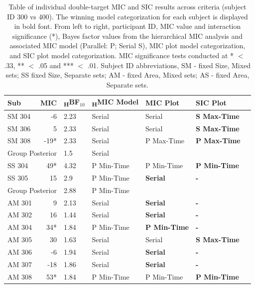 \clearpage
\begin{table}[!htb]
\caption{Table of individual double-target MIC and SIC results across criteria (subject ID 300 vs 400). The winning model categorization for each subject is displayed in bold font. From left to right, participant ID, MIC value and interaction significance (*), Bayes factor values from the hierarchical MIC analysis and associated MIC model (Parallel: P; Serial S), MIC plot model categorization, and SIC plot model categorization. MIC significance tests conducted at * $<$ .33, ** $<$ .05 and *** $<$ .01. Subject ID abbreviations, SM - fixed Size, Mixed sets; SS fixed Size, Separate sets; AM - fixed Area, Mixed sets; AS - fixed Area, Separate sets.}
\centering 
\begin{tabular*}{\textwidth}{l @{\extracolsep{\fill}} rlllll}
\hline
\textbf{Sub  } & \textbf{MIC} & \textbf{\textsubscript{H}BF$_{10}$} & \textbf{\textsubscript{H}MIC Model}  & \textbf{MIC Plot} & \textbf{SIC Plot}\\  
\hline
SM 304  & -6  & 2.23 & Serial & Serial & \textbf{S Max-Time} \\ %
SM 306  & 5  & 2.33 & Serial  & Serial & \textbf{S Max-Time} \\ %
SM 308  & -19*  & 2.33 & Serial  & P Max-Time & \textbf{P Max-Time} \\ %
\multicolumn{2}{r}{Group Posterior} & 1.5 & Serial & ~ & ~\\
\hline
SS 304  & 49*  & 4.32 & P Min-Time  & P Min-Time & \textbf{ P Min-Time} \\ %
SS 305  & 15  & 2.9 & P Min-Time  & \textbf{Serial} & \textbf{ - } \\
\multicolumn{2}{r}{Group Posterior} & 2.88 & P Min-Time & ~ & ~ \\
\hline
AM 301  & 9  & 2.13 & Serial  & \textbf{Serial} & \textbf{ - } \\
AM 302  & 16  & 1.44 & Serial  & \textbf{Serial} & \textbf{ - } \\
AM 304  & 34*  & 1.84 & P Min-Time  & \textbf{P Min-Time} & \textbf{ - } \\
AM 305  & 30  & 1.63 & Serial  & Serial & \textbf{S Max-Time} \\
AM 306  & -6  & 1.94 & Serial  & \textbf{Serial} & \textbf{ - } \\
AM 307  & -18  & 1.86 & Serial  & \textbf{Serial} & \textbf{ - } \\
AM 308  & 53*  & 1.84 & P Min-Time  & P Min-Time & \textbf{P Min-Time} \\

\end{tabular*}
\end{table}
